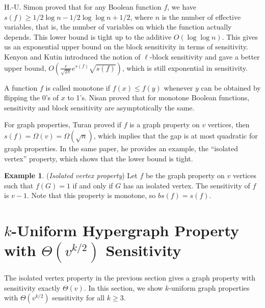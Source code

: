 \documentclass[psamsfonts]{amsart}
\theoremstyle{definition}
\newtheorem{exmp}[theorem]{Example}
\theoremstyle{remark}
\numberwithin{equation}{section}
\begin{document}
	H.-U. Simon \cite{S} proved that for any Boolean function $f$, we have $s(f) \geq 1/2\log n -1/2\log{\log n} + 1/2$, where $n$ is the number of effective variables, that is, the number of variables on which the function actually depends. This lower bound is tight up to the additive  $O(\log{\log n})$. This gives us an exponential upper bound on the block sensitivity in terms of sensitivity. Kenyon and Kutin \cite{KK} introduced the notion of $\ell$-block sensitivity and gave a better upper bound, $O(\frac{e}{\sqrt{2\pi}}e^{s(f)}\sqrt{s(f)})$, which is still exponential in sensitivity.

	A function $f$ is called monotone if $f(x) \leq f(y)$ whenever $y$ can be obtained by flipping the 0's of $x$ to 1's. Nisan \cite{N} proved that for monotone Boolean functions, sensitivity and block sensitivity are asymptotically the same.  

	For graph properties, Turan \cite{T} proved if $f$ is a graph property on $v$ vertices, then $s(f) = \Omega(v) = \Omega(\sqrt{n})$, which implies that the gap is at most quadratic for graph properties. In the same paper, he provides an example, the ``isolated vertex'' property, which shows that the lower bound is tight.

	\begin{exmp} ({\it Isolated vertex property}) 
		Let $f$ be the graph property on $v$ vertices such that $f(G) = 1$ if and only if $G$ has an isolated vertex. The sensitivity of $f$ is $v-1$. Note that this property is monotone, so $bs(f) = s(f)$.
	\end{exmp}
			
\section{$k$-Uniform  Hypergraph Property with $\Theta(v^{k/2})$ Sensitivity}
	The isolated vertex property in the previous section gives a graph property with sensitivity exactly $\Theta(v)$. In this section, we show $k$-uniform graph properties with $\Theta(v^{k/2})$ sensitivity for all $k \geq 3$.
\end{document}

